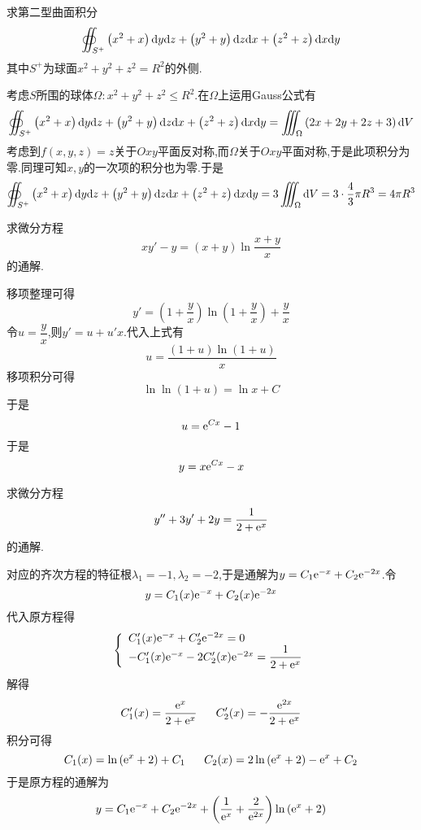 \documentclass{ctexart}
\begin{document}
\begin{problem}[5.(14\songti{分})]
    求第二型曲面积分
    \[\oiint_{S^+}\left(x^2+x\right)\mathrm{d} y\mathrm{d} z+\left(y^2+y\right)\mathrm{d} z\mathrm{d} x+\left(z^2+z\right)\mathrm{d} x\mathrm{d} y\]
    其中$S^+$为球面$x^2+y^2+z^2=R^2$的外侧.
\end{problem}
\begin{solution}
    考虑$S$所围的球体$\Omega:x^2+y^2+z^2\leqslant R^2$.在$\Omega$上运用Gauss公式有
    \[\oiint_{S^+}\left(x^2+x\right)\mathrm{d} y\mathrm{d} z+\left(y^2+y\right)\mathrm{d} z\mathrm{d} x+\left(z^2+z\right)\mathrm{d} x\mathrm{d} y=\iiint_{\Omega}\left(2x+2y+2z+3\right)\mathrm{d} V\]
    考虑到$f(x,y,z)=z$关于$Oxy$平面反对称,而$\Omega$关于$Oxy$平面对称,于是此项积分为零.同理可知$x,y$的一次项的积分也为零.于是
    \[\oiint_{S^+}\left(x^2+x\right)\mathrm{d} y\mathrm{d} z+\left(y^2+y\right)\mathrm{d} z\mathrm{d} x+\left(z^2+z\right)\mathrm{d} x\mathrm{d} y=3\iiint_{\Omega}\mathrm{d} V=3\cdot\dfrac43\pi R^3=4\pi R^3\]

\end{solution}
\begin{problem}[6.(15\songti{分})]
    求微分方程
    \[xy'-y=\left(x+y\right)\ln\dfrac{x+y}{x}\]
    的通解.
\end{problem}
\begin{solution}
    移项整理可得
    \[y'=\left(1+\dfrac{y}{x}\right)\ln\left(1+\dfrac{y}{x}\right)+\dfrac{y}{x}\]
    令$u=\dfrac yx$,则$y'=u+u'x$.代入上式有
    \[u=\dfrac{(1+u)\ln(1+u)}{x}\]
    移项积分可得
    \[\ln\ln(1+u)=\ln x+C\]
    于是
    \[u=\mathrm{e}^{Cx}-1\]
    于是
    \[y=x\mathrm{e}^{Cx}-x\]

\end{solution}
\begin{problem}[7.(15\songti{分})]
    求微分方程
    \[y''+3y'+2y=\dfrac{1}{2+\mathrm{e}^x}\]
    的通解.
\end{problem}
\begin{solution}
    对应的齐次方程的特征根$\lambda_1=-1,\lambda_2=-2$,于是通解为$y=C_1\mathrm{e}^{-x}+C_2\mathrm{e}^{-2x}$.令
    \[y=C_1(x)\mathrm{e}^{-x}+C_2(x)\mathrm{e}^{-2x}\]
    代入原方程得
    \[\left\{\begin{array}{l}
        C_1'(x)\mathrm{e}^{-x}+C_2'\mathrm{e}^{-2x}=0\\
        -C_1'(x)\mathrm{e}^{-x}-2C_2'(x)\mathrm{e}^{-2x}=\dfrac{1}{2+\mathrm{e}^x}
    \end{array}\right.\]
    解得
    \[C_1'(x)=\dfrac{\e^x}{2+\e^x}\ \ \ \ \ C_2'(x)=-\dfrac{\e^{2x}}{2+\e^x}\]
    积分可得
    \[C_1(x)=\ln\left(\e^x+2\right)+C_1\ \ \ \ \ C_2(x)=2\ln\left(\e^x+2\right)-\e^x+C_2\]
    于是原方程的通解为
    \[y=C_1\mathrm{e}^{-x}+C_2\mathrm{e}^{-2x}+\left(\dfrac{1}{\mathrm{e}^x}+\dfrac{2}{\mathrm{e}^{2x}}\right)\ln\left(\mathrm{e}^x+2\right)\]

\end{solution}
\end{document}
